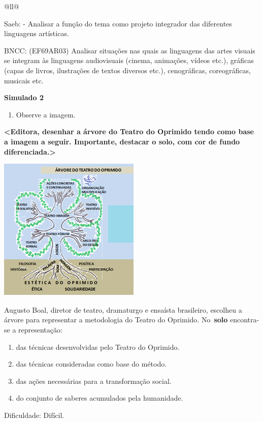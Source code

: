 \begin{itemize}
\begin{itemize}
\begin{escolha}[]{@{}ll@{}}
{{{{{{{{Saeb: - Analisar a função do tema como projeto integrador das diferentes
linguagens artísticas.

BNCC: (EF69AR03) Analisar situações nas quais as linguagens das artes
visuais se integram às linguagens audiovisuais (cinema, animações,
vídeos etc.), gráficas (capas de livros, ilustrações de textos diversos
etc.), cenográficas, coreográficas, musicais etc.

\textbf{Simulado 2}

\begin{enumerate}
\def\labelenumi{\arabic{enumi}.}
\item
  Observe a imagem.
\end{enumerate}

\textbf{\textless{}Editora, desenhar a árvore do Teatro do Oprimido
tendo como base a imagem a seguir. Importante, destacar o solo, com cor
de fundo diferenciada.\textgreater{}}

\includegraphics[width=2.65625in,height=2.69792in]{media/image30.png}

Augusto Boal, diretor de teatro, dramaturgo e ensaísta brasileiro,
escolheu a árvore para representar a metodologia do Teatro do Oprimido.
No~\textbf{solo} encontra-se a representação:

\begin{enumerate}
\def\labelenumi{\alph{enumi})}
\item
  das técnicas desenvolvidas pelo Teatro do Oprimido.
\item
  das técnicas consideradas como base do método.
\item
  das ações necessárias para a transformação social.
\item
  do conjunto de saberes acumulados pela humanidade.
\end{enumerate}

Dificuldade: Difícil.

}}}}}}}}
\end{escolha}
\end{itemize}
\end{itemize}
